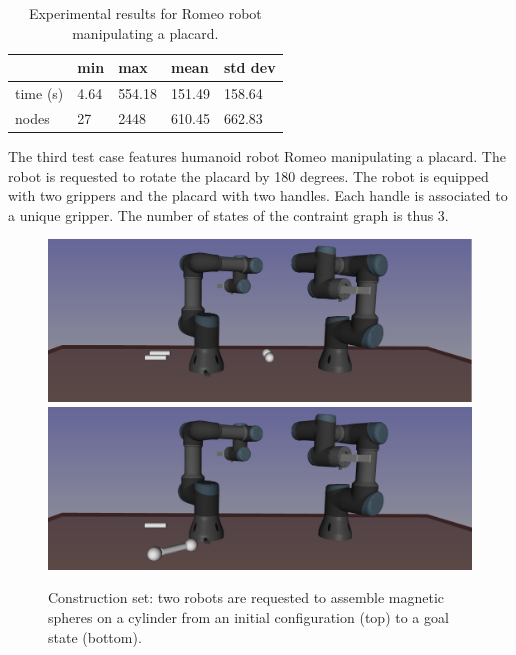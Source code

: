 \begin{table}
  \begin{center}
  \begin{tabular}{|l|l|l|l|l|}
    \hline
    & min & max & mean & std dev \\
    \hline
    time (s) & 4.64 & 554.18 & 151.49 & 158.64 \\
    nodes & 27 &  2448 & 610.45 & 662.83 \\
    \hline
  \end{tabular}
  \end{center}
  \caption{Experimental results for Romeo robot manipulating a placard.}
  \label{tab:romeo-placard}
\end{table}

The third test case features humanoid robot Romeo manipulating a placard. The
robot is requested to rotate the placard by 180 degrees. The robot is equipped
with two grippers and the placard with two handles. Each handle is associated
to a unique gripper. The number of states of the contraint graph is thus 3.

\begin{figure}
  \begin{center}
    \includegraphics[width=\linewidth]{figures/construction-set-init.png}
    \includegraphics[width=\linewidth]{figures/construction-set-goal.png}    
  \end{center}
  \caption{Construction set: two robots are requested to assemble magnetic
    spheres on a cylinder from an initial configuration (top) to a goal state
    (bottom).}
  \label{fig:construction-set}
\end{figure}

